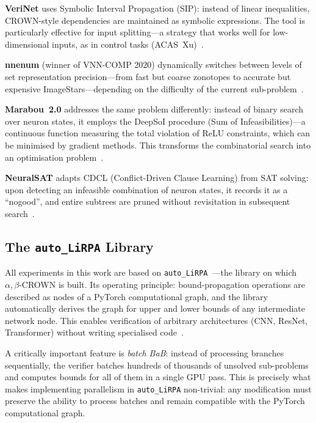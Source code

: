 \textbf{VeriNet} uses Symbolic Interval Propagation (SIP): instead of linear
inequalities, CROWN-style dependencies are maintained as symbolic expressions.
The tool is particularly effective for input splitting---a strategy that works
well for low-dimensional inputs, as in control tasks (ACAS~Xu)~\cite{IntervalReachabilityAnalysis}.

\textbf{nnenum} (winner of VNN-COMP 2020) dynamically switches between levels
of set representation precision---from fast but coarse zonotopes to accurate
but expensive ImageStars---depending on the difficulty of the current
sub-problem~\cite{NNEnumPaper}.

\textbf{Marabou~2.0} addresses the same problem differently: instead of binary
search over neuron states, it employs the DeepSoI procedure
(Sum of Infeasibilities)---a continuous function measuring the total violation
of ReLU constraints, which can be minimised by gradient
methods. This transforms the combinatorial search into an optimisation
problem~\cite{arXiv2401Marabou2}.

\textbf{NeuralSAT} adapts CDCL (Conflict-Driven Clause Learning) from SAT
solving: upon detecting an infeasible combination of neuron states, it records
it as a ``nogood'', and entire subtrees are pruned without revisitation in
subsequent search~\cite{NeuralSATRepo}.

\subsection{The \texorpdfstring{\texttt{auto\_LiRPA}}{auto\_LiRPA} Library}

All experiments in this work are based on
\texttt{auto\_LiRPA}~\cite{AlphaBetaCrownVNNCOMP23}---the library on which
$\alpha,\beta$-CROWN is built. Its operating principle: bound-propagation
operations are described as nodes of a PyTorch computational graph, and the
library automatically derives the graph for upper and lower bounds of any
intermediate network node. This enables verification of arbitrary architectures
(CNN, ResNet, Transformer) without writing specialised
code~\cite{LiRPAVerifyRepo}.

A critically important feature is \textit{batch BaB}: instead of processing
branches sequentially, the verifier batches hundreds of thousands of unsolved
sub-problems and computes bounds for all of them in a single GPU pass.
This is precisely what makes implementing parallelism in \texttt{auto\_LiRPA}
non-trivial: any modification must preserve the ability to process batches
and remain compatible with the PyTorch computational graph.
